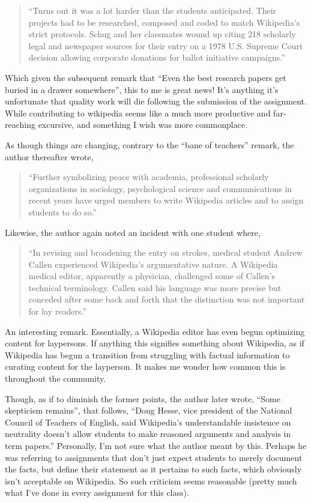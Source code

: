 \begin{quotation}
“Turns out it was a lot harder than the students anticipated. Their projects had to be researched, composed and coded to match Wikipedia’s strict protocols. Schug and her classmates wound up citing 218 scholarly legal and newspaper sources for their entry on a 1978 U.S. Supreme Court decision allowing corporate donations for ballot initiative campaigns.” 
\end{quotation}


Which given the subsequent remark that “Even the best research papers get buried in a drawer somewhere”, this to me is great news! It’s anything it’s unfortunate that quality work will die following the submission of the assignment. While contributing to wikipedia seems like a much more productive and far-reaching excursive, and something I wish was more commonplace.

As though things are changing, contrary to the “bane of teachers” remark, the author thereafter wrote,
\begin{quotation}
``Further symbolizing peace with academia, professional scholarly organizations in sociology, psychological science and communications in recent years have urged members to write Wikipedia articles and to assign students to do so.''
\end{quotation}

Likewise, the author again noted an incident with one student where,

\begin{quotation}
``In revising and broadening the entry on strokes, medical student Andrew Callen experienced Wikipedia’s argumentative nature. A Wikipedia medical editor, apparently a physician, challenged some of Callen’s technical terminology.  Callen said his language was more precise but conceded after some back and forth that the distinction was not important for lay readers.''
\end{quotation}

An interesting remark. Essentially, a Wikipedia editor has even begun optimizing content for laypersons. If anything this signifies something about Wikipedia, as if Wikipedia has begun a transition from struggling with factual information to curating content for the layperson. It makes me wonder how common this is throughout the community. 

Though, as if to diminish the former points, the author later wrote, “Some skepticism remains”, that follows, “Doug Hesse, vice president of the National Council of Teachers of English, said Wikipedia’s understandable insistence on neutrality doesn’t allow students to make reasoned arguments and analysis in term papers.” Personally, I’m not sure what the author meant by this. Perhaps he was referring to assignments that don’t just expect students to merely document the facts, but define their statement as it pertains to such facts, which obviously isn’t acceptable on Wikipedia. So such criticism seems reasonable (pretty much what I’ve done in every assignment for this class). 

